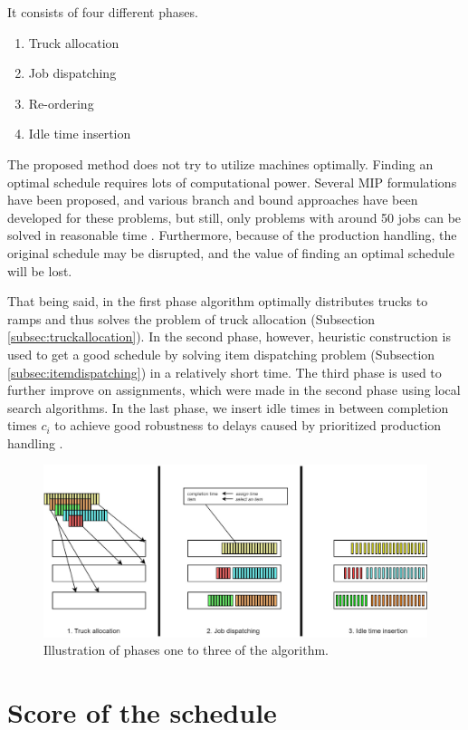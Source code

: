 \documentclass{ctuthesis}
\begin{document}
It consists of four different phases.

\begin{enumerate}
    \item Truck allocation
    \item Job dispatching
    \item Re-ordering
    \item Idle time insertion
\end{enumerate}

The proposed method does not try to utilize machines optimally. Finding an optimal schedule requires lots of computational power. Several MIP formulations have been proposed, and various branch and bound approaches have been developed for these problems, but still, only problems with around 50 jobs can be solved in reasonable time \cite{pinedo}. Furthermore, because of the production handling, the original schedule may be disrupted, and the value of finding an optimal schedule will be lost. 

That being said, in the first phase algorithm optimally distributes trucks to ramps and thus solves the problem of truck allocation (Subsection \ref{subsec:truckallocation}). In the second phase, however, heuristic construction is used to get a good schedule by solving item dispatching problem (Subsection \ref{subsec:itemdispatching}) in a relatively short time. The third phase is used to further improve on assignments, which were made in the second phase using local search algorithms. In the last phase, we insert idle times in between completion times $c_i$ to achieve good robustness to delays caused by prioritized production handling \cite{pinedo}. 

\begin{figure}[H]
\includegraphics[width=1.0\linewidth]{algo.jpg}
\caption{Illustration of phases one to three of the algorithm.}
\end{figure}

\section{Score of the schedule}
\end{document}
